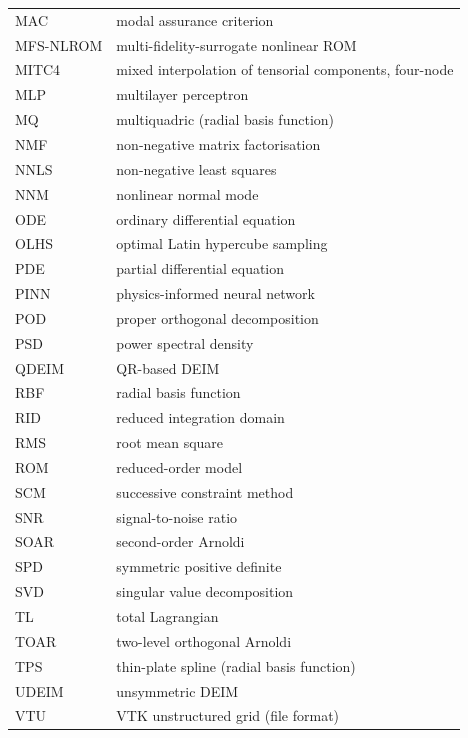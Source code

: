 \begin{longtable}{@{}p{}p{}@{}}
MAC & modal assurance criterion\\
MFS-NLROM & multi-fidelity-surrogate nonlinear ROM\\
MITC4 & mixed interpolation of tensorial components, four-node\\
MLP & multilayer perceptron\\
MQ & multiquadric (radial basis function)\\
NMF & non-negative matrix factorisation\\
NNLS & non-negative least squares\\
NNM & nonlinear normal mode\\
ODE & ordinary differential equation\\
OLHS & optimal Latin hypercube sampling\\
PDE & partial differential equation\\
PINN & physics-informed neural network\\
POD & proper orthogonal decomposition\\
PSD & power spectral density\\
QDEIM & QR-based DEIM\\
RBF & radial basis function\\
RID & reduced integration domain\\
RMS & root mean square\\
ROM & reduced-order model\\
SCM & successive constraint method\\
SNR & signal-to-noise ratio\\
SOAR & second-order Arnoldi\\
SPD & symmetric positive definite\\
SVD & singular value decomposition\\
TL & total Lagrangian\\
TOAR & two-level orthogonal Arnoldi\\
TPS & thin-plate spline (radial basis function)\\
UDEIM & unsymmetric DEIM\\
VTU & VTK unstructured grid (file format)\\
\bottomrule
\end{longtable}
\endgroup

